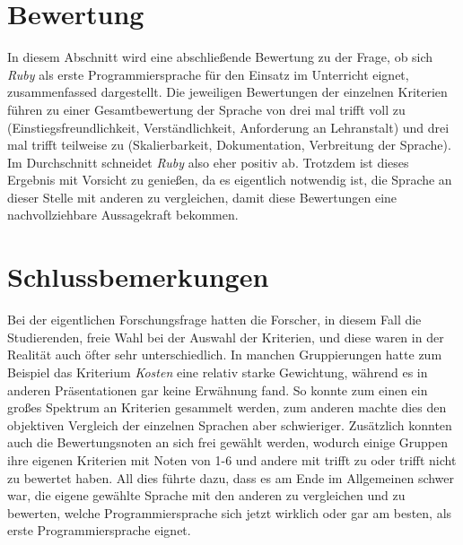 \documentclass[12pt,DIV=14, version=first, BCOR=10mm,a4paper,twoside,parskip=half-,headsepline,headinclude]{scrartcl}
\begin{document}
\section{Bewertung}
\begin{flushleft}
In diesem Abschnitt wird eine abschließende Bewertung zu der Frage, ob sich \textit{\glqq Ruby\grqq} als erste Programmiersprache für den Einsatz im Unterricht eignet, zusammenfassed dargestellt. Die jeweiligen Bewertungen der einzelnen Kriterien führen zu einer Gesamtbewertung der Sprache von drei mal
{\glqq trifft voll zu\grqq} (Einstiegsfreundlichkeit, Verständlichkeit, Anforderung an Lehranstalt) und drei mal {\glqq trifft teilweise zu\grqq} (Skalierbarkeit, Dokumentation, Verbreitung der Sprache). Im Durchschnitt schneidet \textit{\glqq Ruby\grqq} also eher positiv ab.
Trotzdem ist dieses Ergebnis mit Vorsicht zu genießen, da es eigentlich notwendig ist, die Sprache an dieser Stelle mit anderen zu vergleichen, damit diese Bewertungen eine nachvollziehbare Aussagekraft bekommen.
\end{flushleft}

\section{Schlussbemerkungen}
\begin{flushleft}
Bei der eigentlichen Forschungsfrage hatten die Forscher, in diesem Fall die Studierenden, freie Wahl bei der Auswahl der Kriterien, und diese waren in der Realität auch öfter sehr unterschiedlich. In manchen Gruppierungen hatte zum Beispiel das Kriterium \textit{Kosten} eine relativ starke Gewichtung, während es in anderen Präsentationen gar keine Erwähnung fand. So konnte zum einen ein großes Spektrum an Kriterien gesammelt werden, zum anderen machte dies den objektiven Vergleich der einzelnen Sprachen aber schwieriger. Zusätzlich konnten auch die {\glqq Bewertungsnoten\grqq} an sich frei gewählt werden, wodurch einige Gruppen ihre eigenen Kriterien mit Noten von 1-6 und andere mit {\glqq trifft zu\grqq} oder {\glqq trifft nicht zu\grqq} bewertet haben. All dies führte dazu, dass es am Ende im Allgemeinen schwer war, die eigene gewählte Sprache mit den anderen zu vergleichen und zu bewerten, welche Programmiersprache sich jetzt wirklich oder gar am {\glqq besten\grqq}, als erste Programmiersprache eignet. 
\end{flushleft}

\pagebreak
\end{document}
